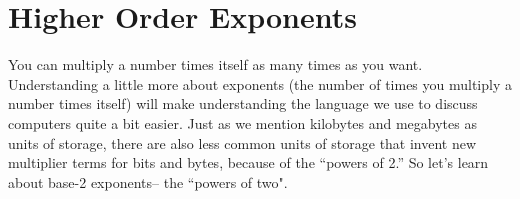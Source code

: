 \section{Higher Order Exponents}

You can multiply a number times itself as many times as you want. Understanding a little more about exponents (the number of times you multiply a number times itself) will make understanding the language we use to discuss computers quite a bit easier. Just as we mention kilobytes and megabytes as units of storage, there are also less common units of storage that invent new multiplier terms for bits and bytes, because of the ``powers of 2.'' So let's learn about base-2 exponents-- the ``powers of two".

\bigskip
\newcommand{\expline}[2]{
$2^{#1}$ & = & #2 
}

